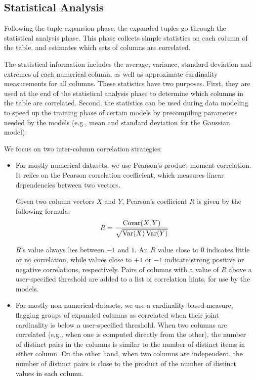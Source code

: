 \subsection{Statistical Analysis}
\label{sec:statistical-analysis}

Following the tuple expansion phase, the expanded tuples go through the statistical analysis phase. This phase collects simple statistics on each column of the table, and estimates which sets of columns are correlated.

The statistical information includes the average, variance, standard deviation and extremes of each numerical column, as well as approximate cardinality measurements for all columns. These statistics have two purposes. First, they are used at the end of the statistical analysis phase to determine which columns in the table are correlated. Second, the statistics can be used during data modeling to speed up the training phase of certain models by precompiling parameters needed by the models (e.g., mean and standard deviation for the Gaussian model).

We focus on two inter-column correlation strategies:

\begin{itemize}
\item For mostly-numerical datasets, we use Pearson's product-moment
  correlation. It relies on the Pearson correlation coefficient,
  which measures linear dependencies between two vectors.

  Given two column vectors $X$ and $Y$, Pearson's coefficient $R$ is given by the following formula:
  \begin{align}
    \label{eqn:pearson}
    R = \frac{\operatorname{Covar}(X,Y)}{\sqrt{\operatorname{Var}(X)\operatorname{Var}(Y)}}
  \end{align}

  $R$'s value always lies between $-1$ and $1$. An $R$ value close to 0 indicates little or no correlation, while values close to $+1$ or $-1$ indicate strong positive or negative correlations, respectively. Pairs of columns with a value of \(R\) above a user-specified threshold are added to a list of correlation hints, for use by the models.

\item For mostly non-numerical datasets, we use a cardinality-based measure, flagging groups of expanded columns as correlated when their joint cardinality is below a user-specified threshold. When two columns are correlated (e.g., when one is computed directly from the other), the number of distinct pairs in the columns is similar to the number of distinct items in either column. On the other hand, when two columns are independent, the number of distinct pairs is close to the product of the number of distinct values in each column.
\end{itemize}

